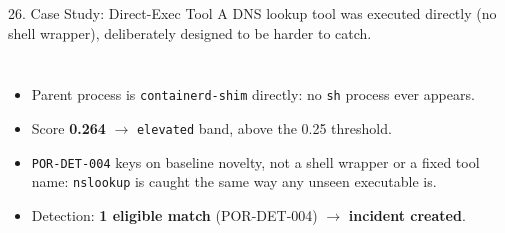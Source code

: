 \documentclass[aspectratio=169, 11pt]{beamer}
\begin{document}
\begin{frame}{26. Case Study: Direct-Exec Tool}
    \footnotesize
    A DNS lookup tool was executed directly (no shell wrapper), deliberately designed to be harder to catch.
    \begin{columns}[T]
        \begin{itemize}\setlength\itemsep{3pt}
            \item Parent process is \texttt{containerd-shim} directly: no \texttt{sh} process ever appears.
            \item Score \textbf{0.264} $\to$ \texttt{elevated} band, above the 0.25 threshold.
            \item \texttt{POR-DET-004} keys on baseline novelty, not a shell wrapper or a fixed tool name: \texttt{nslookup} is caught the same way any unseen executable is.
            \item Detection: \textbf{1 eligible match} (POR-DET-004) $\to$ \textbf{incident created}.
        \end{itemize}
        \fboxsep=4pt
    \end{columns}
\end{frame}
\end{document}
